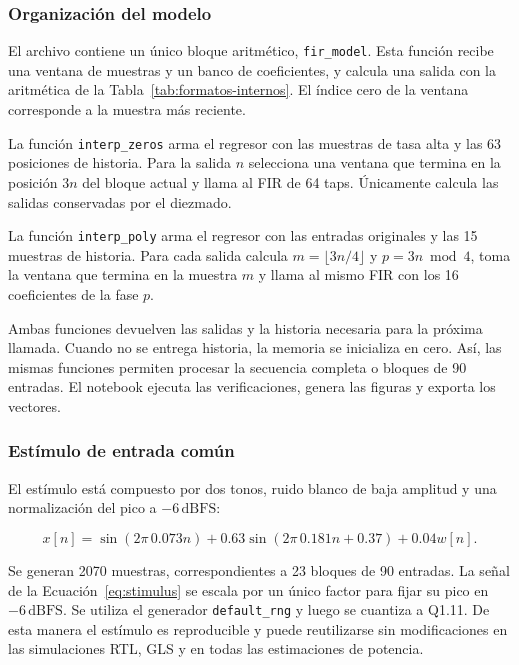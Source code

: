 \documentclass[10pt,a4paper]{article}
\begin{document}
\subsubsection*{Organización del modelo}

El archivo  contiene un único bloque
aritmético, \texttt{fir\_model}. Esta función recibe una ventana de muestras y
un banco de coeficientes, y calcula una salida con la aritmética de la
Tabla~\ref{tab:formatos-internos}. El índice cero de la ventana corresponde
a la muestra más reciente.

La función \texttt{interp\_zeros} arma el regresor con las muestras de tasa
alta y las 63 posiciones de historia. Para la salida $n$ selecciona una ventana
que termina en la posición $3n$ del bloque actual y llama al FIR de 64 taps.
Únicamente calcula las salidas conservadas por el diezmado.

La función \texttt{interp\_poly} arma el regresor con las entradas originales
y las 15 muestras de historia. Para cada salida calcula $m=\lfloor3n/4\rfloor$
y $p=3n\bmod4$, toma la ventana que termina en la muestra $m$ y llama al mismo
FIR con los 16 coeficientes de la fase $p$.

Ambas funciones devuelven las salidas y la historia necesaria para la próxima
llamada. Cuando no se entrega historia, la memoria se inicializa en cero. Así,
las mismas funciones permiten procesar la secuencia completa o bloques de 90
entradas. El notebook  ejecuta las 
verificaciones, genera las figuras y exporta los vectores.

\subsubsection*{Estímulo de entrada común}

El estímulo está compuesto por dos tonos, ruido blanco de baja amplitud y una
normalización del pico a $-6\,\mathrm{dBFS}$:

\begin{equation}
x[n]=\sin(2\pi\,0.073n)
    +0.63\sin(2\pi\,0.181n+0.37)
    +0.04w[n].
\label{eq:stimulus}
\end{equation}

Se generan 2070 muestras, correspondientes a 23 bloques de 90 entradas.
La señal de la Ecuación~\eqref{eq:stimulus} se escala por un único factor para
fijar su pico en $-6\,\mathrm{dBFS}$. Se utiliza el generador
\texttt{default\_rng} y luego se cuantiza a Q1.11. De esta manera 
el estímulo es reproducible y puede reutilizarse sin modificaciones
en las simulaciones RTL, GLS y en todas las estimaciones de potencia.
\end{document}
